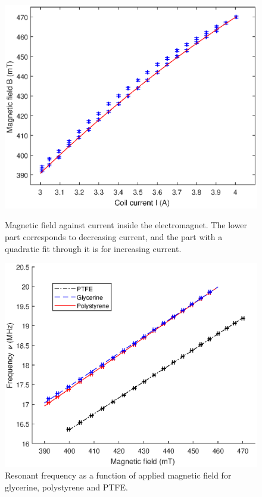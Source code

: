\documentclass[a4paper]{jpconf}
\numberwithin{equation}{section}
\begin{document}
\begin{figure}[htbp]
	\begin{minipage}[b]{2.9in}
		\includegraphics[scale=0.55]{NMR_calibration_nocaption_nolegend_red.eps}
		\caption{Magnetic field against current inside the electromagnet. The lower part corresponds to decreasing current, and the part with a quadratic fit through it is for increasing current.}
		\label{fig: hysteresis curve}
	\end{minipage}
	\hspace{1.5pc}
	\begin{minipage}[b]{3.1in}
		\includegraphics[scale=0.55]{NMR_resonances.eps}
		\caption{Resonant frequency as a function of applied magnetic field for glycerine, polystyrene and PTFE.}
		\label{fig: NMR resonances}
	\end{minipage}
\end{figure}
\end{document}
